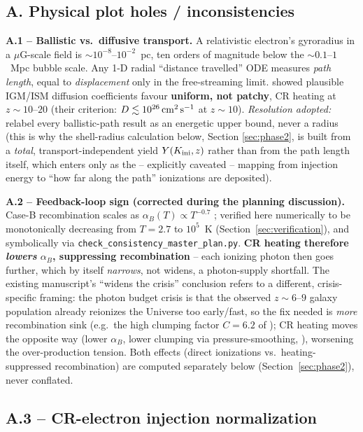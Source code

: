 \documentclass[11pt,a4paper]{article}
\newcommand{\Kini}{K_{\rm ini}}
\begin{document}
\subsection{A. Physical plot holes / inconsistencies}
\label{sec:planA}

\textbf{A.1 -- Ballistic vs.\ diffusive transport.} A relativistic electron's gyroradius in a
$\mu$G-scale field is $\sim10^{-8}$--$10^{-2}$~pc, ten orders of magnitude below the
$\sim0.1$--$1$~Mpc bubble scale. Any 1-D radial ``distance travelled'' ODE measures
\emph{path length}, equal to \emph{displacement} only in the free-streaming limit.
\citet{Jana2018} showed plausible IGM/ISM diffusion coefficients favour \textbf{uniform, not
patchy}, CR heating at $z\sim10$--$20$ (their criterion: $D\lesssim10^{26}\,{\rm cm^2\,s^{-1}}$
at $z\sim10$). \emph{Resolution adopted:} relabel every ballistic-path result as an energetic
upper bound, never a radius (this is why the shell-radius calculation below, Section
\ref{sec:phase2}, is built from a \emph{total}, transport-independent yield $Y(\Kini,z)$ rather
than from the path length itself, which enters only as the -- explicitly caveated -- mapping
from injection energy to ``how far along the path'' ionizations are deposited).

\textbf{A.2 -- Feedback-loop sign (corrected during the planning discussion).} Case-B
recombination scales as $\alpha_B(T)\propto T^{-0.7}$ \citep{HuiGnedin1997}; verified here
numerically to be monotonically decreasing from $T=2.7$ to $10^5$~K
(Section~\ref{sec:verification}), and symbolically via \texttt{check\_consistency\_master\_plan.py}.
\textbf{CR heating therefore \emph{lowers} $\alpha_B$, suppressing recombination} -- each
ionizing photon then goes further, which by itself \emph{narrows}, not widens, a photon-supply
shortfall. The existing manuscript's ``widens the crisis'' conclusion refers to a different,
crisis-specific framing: the photon budget crisis \citep{Munoz2024} is that the observed
$z\sim6$--$9$ galaxy population already reionizes the Universe too early/fast, so the fix
needed is \emph{more} recombination sink (e.g.\ the high clumping factor $C=6.2$ of
\citealt{Austin2025}); CR heating moves the opposite way (lower $\alpha_B$, lower clumping via
pressure-smoothing, \citealt{Pawlik2009}), worsening the over-production tension. Both effects
(direct ionizations vs.\ heating-suppressed recombination) are computed separately below
(Section~\ref{sec:phase2}), never conflated.

\subsection{A.3 -- CR-electron injection normalization}
\label{sec:aA3}
\end{document}
